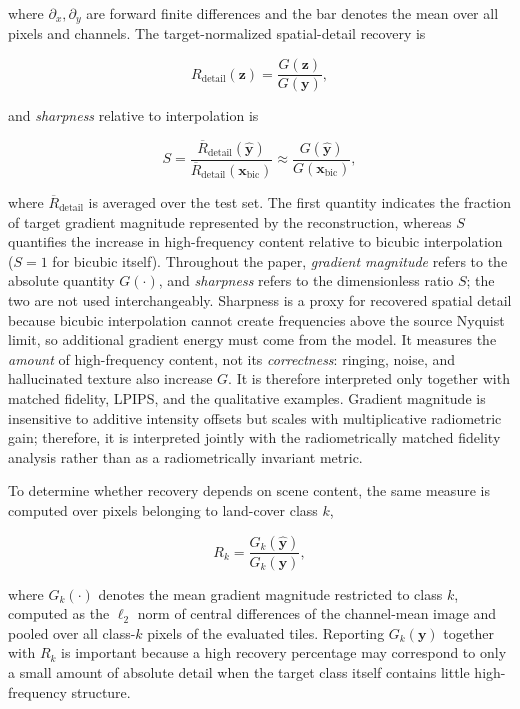 \documentclass[conference]{IEEEtran}
\begin{document}
where $\partial_x,\partial_y$ are forward finite differences and the
bar denotes the mean over all pixels and channels. The
target-normalized spatial-detail recovery is

\begin{equation}
R_{\mathrm{detail}}(\mathbf{z})
=
\frac{G(\mathbf{z})}
     {G(\mathbf{y})},
\label{eq:detail_recovery}
\end{equation}

and \emph{sharpness} relative to interpolation is

\begin{equation}
S
=
\frac{\overline{R}_{\mathrm{detail}}(\hat{\mathbf{y}})}
     {\overline{R}_{\mathrm{detail}}(\mathbf{x}_{\mathrm{bic}})}
\approx
\frac{G(\hat{\mathbf{y}})}
     {G(\mathbf{x}_{\mathrm{bic}})},
\label{eq:bic_recovery}
\end{equation}

where $\overline{R}_{\mathrm{detail}}$ is averaged over the test set.
The first quantity indicates the fraction of target gradient magnitude
represented by the reconstruction, whereas $S$ quantifies the
increase in high-frequency content relative to bicubic interpolation
($S=1$ for bicubic itself).
Throughout the paper, \emph{gradient magnitude} refers to the absolute
quantity $G(\cdot)$, and \emph{sharpness} refers to the dimensionless
ratio $S$; the two are not used interchangeably.
Sharpness is a proxy for recovered spatial detail because bicubic
interpolation cannot create frequencies above the source Nyquist
limit, so additional gradient energy must come from the model. It
measures the \emph{amount} of high-frequency content, not its
\emph{correctness}: ringing, noise, and hallucinated texture also
increase $G$. It is therefore interpreted only together with matched
fidelity, LPIPS, and the qualitative examples.
Gradient magnitude is insensitive to additive intensity offsets but
scales with multiplicative radiometric gain; therefore, it is
interpreted jointly with the radiometrically matched fidelity analysis
rather than as a radiometrically invariant metric.

To determine whether recovery depends on scene content, the same
measure is computed over pixels belonging to land-cover class $k$,

\begin{equation}
R_{k}
=
\frac{G_{k}(\hat{\mathbf{y}})}
     {G_{k}(\mathbf{y})},
\label{eq:class_recovery}
\end{equation}

where $G_k(\cdot)$ denotes the mean gradient magnitude restricted to
class $k$, computed as the $\ell_2$ norm of central differences of
the channel-mean image and pooled over all class-$k$ pixels of the
evaluated tiles. Reporting $G_k(\mathbf{y})$ together with $R_k$ is important
because a high recovery percentage may correspond to only a small
amount of absolute detail when the target class itself contains little
high-frequency structure.
\end{document}
